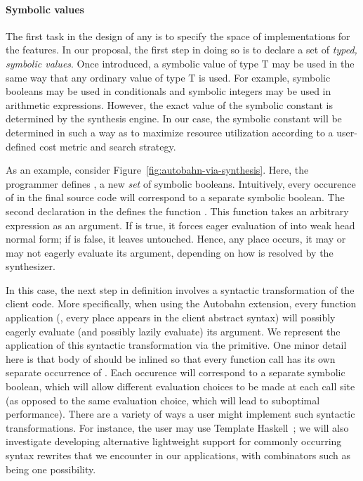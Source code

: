 \paragraph*{Symbolic values}
The first task in the design of any \rasp{} is to specify the space of
implementations for the \rasp{} features.  In our proposal, the first step
in doing so is to declare a set of \emph{typed, symbolic values}.  Once introduced, a symbolic value
of type T may be used in the same way that any ordinary value of type T is used.
For example, symbolic booleans may be used in conditionals and symbolic integers may be used
in arithmetic expressions.  However, the exact value of the symbolic constant is
determined by the synthesis engine.  In our case, the symbolic constant will be determined
in such a way as to maximize resource utilization according to a user-defined cost metric and
search strategy.

As an example, consider Figure~\ref{fig:autobahn-via-synthesis}.  Here, the programmer
defines , a new \emph{set} of symbolic booleans.  Intuitively, every occurence of 
in the final source code will correspond to a separate symbolic boolean.  The second declaration in
the \rasp{} defines the function .  This function takes an arbitrary expression 
as an argument.  If  is true, it forces eager evaluation of  into weak head normal
form; if   is false, it leaves  untouched.  Hence, any
place  occurs, it
may or may not eagerly evaluate its argument, depending on how  is resolved by the
synthesizer.

In this case, the next step in \rasp{} definition involves a syntactic
transformation of the client code.  More specifically, when using the
Autobahn extension, every function application (\ie, every place
 appears in the client abstract syntax) will possibly
eagerly evaluate (and possibly lazily evaluate) its argument.  We
represent the application of this syntactic transformation via the
 primitive.  One minor detail here is that body of
 should be inlined so that every function call has its own
separate occurrence of .  Each occurence will correspond to a
separate symbolic boolean, which will allow different evaluation
choices to be made at each call site (as opposed to the same
evaluation choice, which will lead to suboptimal performance).  There
are a variety of ways a user might implement such syntactic
transformations.  For instance, the user may use Template
Haskell~\cite{template-haskell}; we will also investigate developing
alternative lightweight support for commonly occurring syntax rewrites
that we encounter in our applications, with combinators such as
 being one possibility.

